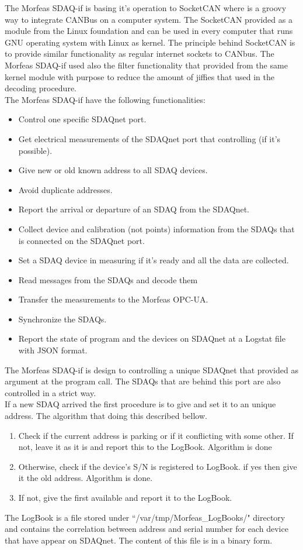 \documentclass{article}
\begin{document}
The Morfeas SDAQ-if is basing it's operation to SocketCAN where is a groovy way to integrate CANBus on a computer system. The SocketCAN provided as a module from the Linux
foundation and can be used in every computer that runs GNU operating system with Linux as kernel. The principle behind SocketCAN is to provide similar functionality as regular internet sockets to CANbus.
The Morfeas SDAQ-if used also the filter functionality that provided from the same kernel module with purpose to reduce the amount of jiffies that used in the decoding procedure.\\
The Morfeas SDAQ-if have the following functionalities:
\begin{itemize}
	\item Control one specific SDAQnet port.
	\item Get electrical measurements of the SDAQnet port that controlling (if it's possible).
	\item Give new or old known address to all SDAQ devices.
	\item Avoid duplicate addresses.
	\item Report the arrival or departure of an SDAQ from the SDAQnet.
	\item Collect device and calibration (not points) information from the SDAQs that is connected on the SDAQnet port.
	\item Set a SDAQ device in measuring if it's ready and all the data are collected.
	\item Read messages from the SDAQs and decode them
	\item Transfer the measurements to the Morfeas OPC-UA.
	\item Synchronize the SDAQs.
	\item Report the state of program and the devices on SDAQnet at a Logstat file with JSON format.
\end{itemize}
The Morfeas SDAQ-if is design to controlling a unique SDAQnet that provided as argument at the program call. The SDAQs that are behind this port are also controlled in a strict way.\\
If a new SDAQ arrived the first procedure is to give and set it to an unique address. The algorithm that doing this described bellow.
\begin{enumerate}
	\item Check if the current address is parking or if it conflicting with some other. If not, leave it as it is and report this to the LogBook. Algorithm is done
	\item Otherwise, check if the device's S/N is registered to LogBook. if yes then give it the old address. Algorithm is done.
	\item If not, give the first available and report it to the LogBook.
\end{enumerate}
The LogBook is a file stored under ``/var/tmp/Morfeas\_LogBooks/" directory and contains the correlation between address and serial number for each device that have appear on SDAQnet.
The content of this file is in a binary form.
\end{document}
